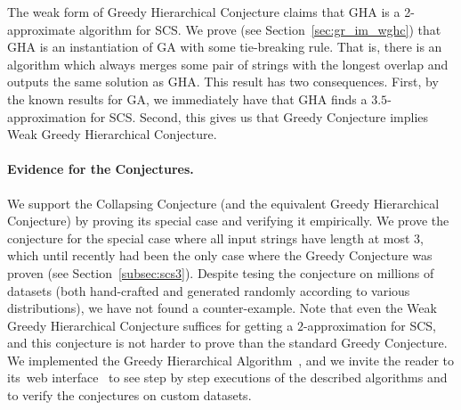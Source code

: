 The weak form of Greedy Hierarchical Conjecture claims that GHA is a 2-approximate algorithm for SCS. 
We prove (see Section~\ref{sec:gr_im_wghc}) that GHA is an instantiation of GA with some tie-breaking rule. That is, there is an algorithm which always merges some pair of strings with the longest overlap and outputs the same solution as GHA. This result has two consequences. First, by the known results for GA, we immediately have that GHA finds a $3.5$-approximation for SCS. Second, this gives us that Greedy Conjecture implies Weak Greedy Hierarchical Conjecture. 

\paragraph{Evidence for the Conjectures.}
We support the Collapsing Conjecture (and the equivalent Greedy Hierarchical Conjecture) by proving its special case and verifying it empirically. We prove the conjecture for the special case where all input strings have length at most $3$, which until recently had been the only case where the Greedy Conjecture was proven (see Section~\ref{subsec:scs3}). Despite tesing the conjecture on millions of datasets (both hand-crafted and generated randomly according to various distributions), we have not found a counter-example. Note that even the Weak Greedy Hierarchical Conjecture suffices for getting a $2$-approximation for SCS, and this conjecture is not harder to prove than the standard Greedy Conjecture.
We implemented the Greedy Hierarchical Algorithm~\cite{github}, and we invite the reader to its~web interface~\cite{webpage} to see step by step executions of the described algorithms and to verify the conjectures on
custom datasets.


